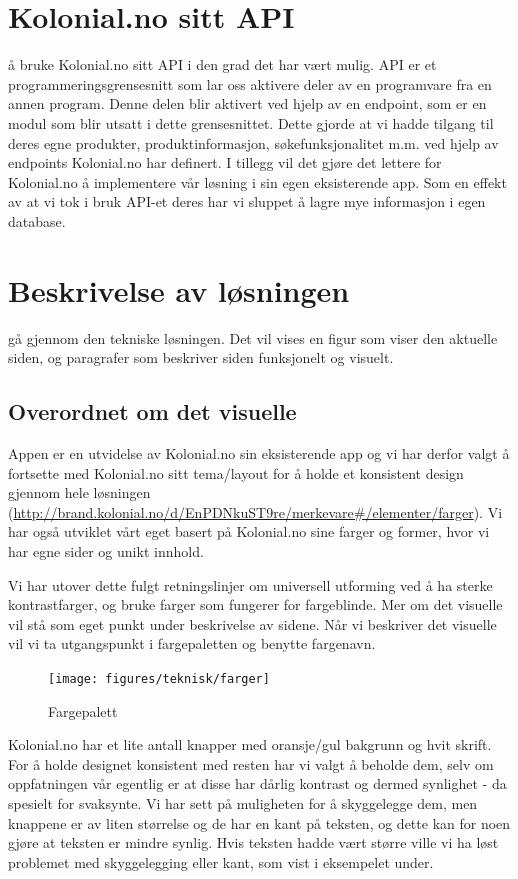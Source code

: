 \section{\textbf{Kolonial.no sitt API}}
 å bruke Kolonial.no sitt API i den grad det har vært mulig. API er et programmeringsgrensesnitt som lar oss aktivere deler av en programvare fra en annen program. Denne delen blir aktivert ved hjelp av en endpoint, som er en modul som blir utsatt i dette grensesnittet. Dette gjorde at vi hadde tilgang til deres egne produkter, produktinformasjon, søkefunksjonalitet m.m. ved hjelp av endpoints Kolonial.no har definert. I tillegg vil det gjøre det lettere for Kolonial.no å implementere vår løsning i sin egen eksisterende app. Som en effekt av at vi tok i bruk API-et deres har vi sluppet å lagre mye informasjon i egen database.

\section{\textbf{Beskrivelse av løsningen}}
 gå gjennom den tekniske løsningen.
Det vil vises en figur som viser den aktuelle siden, og paragrafer som beskriver siden funksjonelt og visuelt.

\subsection{\textbf{Overordnet om det visuelle}}
Appen er en utvidelse av Kolonial.no sin eksisterende app og vi har derfor valgt å fortsette med Kolonial.no sitt tema/layout for å holde et konsistent design gjennom hele løsningen (\url{http://brand.kolonial.no/d/EnPDNkuST9re/merkevare#/elementer/farger}). Vi har også utviklet vårt eget basert på Kolonial.no sine farger og former, hvor vi har egne sider og unikt innhold. 

Vi har utover dette fulgt retningslinjer om universell utforming ved å ha sterke kontrastfarger, og bruke farger som fungerer for fargeblinde. Mer om det visuelle vil stå som eget punkt under beskrivelse av sidene. Når vi beskriver det visuelle vil vi ta utgangspunkt i fargepaletten og benytte fargenavn.

\begin{figure}[H]
    \texttt{[image: figures/teknisk/farger]}
    \caption[Fargepalett]{Fargepalett
    \label{fig:color_palette}}
\end{figure}

Kolonial.no har et lite antall knapper med oransje/gul bakgrunn og hvit skrift. For å holde designet konsistent med resten har vi valgt å beholde dem, selv om oppfatningen vår egentlig er at disse har dårlig kontrast og dermed synlighet - da spesielt for svaksynte. Vi har sett på muligheten for å skyggelegge dem, men knappene er av liten størrelse og de har en kant på teksten, og dette kan for noen gjøre at teksten er mindre synlig. Hvis teksten hadde vært større ville vi ha løst problemet med skyggelegging eller kant, som vist i eksempelet under.

